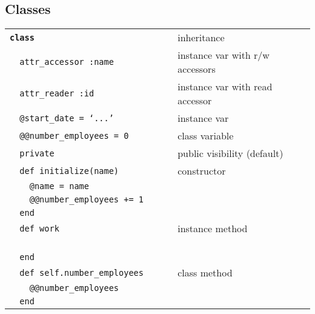 \documentclass[6pt]{article}
\begin{document}
\begin{multicols}{3}
  \section{Classes}
  \begin{tabular}{L{0.55\linewidth} L{0.45\linewidth}}
    \tt \textbf{class}   & inheritance                                           \\
    \tt ~~attr\_accessor :name                   & instance var with r/w accessors                       \\
    \tt ~~attr\_reader :id                       & instance var with read accessor                       \\
    \tt ~~@start\_date = `...'                   & instance var                                          \\
    \tt ~~@@number\_employees = 0                & class variable                                        \\
    \tt ~~private                                & public visibility (default)                           \\
    \tt ~~def initialize(name)                   & constructor                                           \\
    \tt ~~~~@name = name                                                                                 \\
    \tt ~~~~@@number\_employees += 1                                                                     \\
    \tt ~~end                                                                                            \\
    \tt ~~def work                               & instance method                                       \\
    \tt ~~~~                                                                              \\
    \tt ~~end                                                                                            \\
    \tt ~~def self.number\_employees             & class method                                          \\
    \tt ~~~~@@number\_employees                                                                          \\
    \tt ~~end                                                                                            \\

\end{tabular}
\end{multicols}
\end{document}
